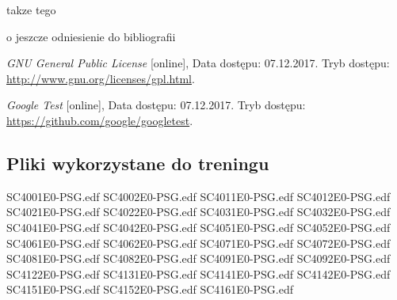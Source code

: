 \documentclass[12pt, notitlepage]{report}
\begin{document}
takze tego

o jeszcze odniesienie do bibliografii \cite{gtest}

\begin{thebibliography}{9}

\textit{GNU General Public License} [online], Data dostępu: 07.12.2017. 
\newline Tryb dostępu: \url{http://www.gnu.org/licenses/gpl.html}.


\textit{Google Test} [online], Data dostępu: 07.12.2017. \newline Tryb dostępu: \url{https://github.com/google/googletest}.

\end{thebibliography}

\begin{appendices}
    \chapter{Pliki wykorzystane do treningu}
    \label{appendix:A}
    SC4001E0-PSG.edf \newline
    SC4002E0-PSG.edf \newline
    SC4011E0-PSG.edf \newline
    SC4012E0-PSG.edf \newline
    SC4021E0-PSG.edf \newline
    SC4022E0-PSG.edf \newline
    SC4031E0-PSG.edf \newline
    SC4032E0-PSG.edf \newline
    SC4041E0-PSG.edf \newline
    SC4042E0-PSG.edf \newline
    SC4051E0-PSG.edf \newline
    SC4052E0-PSG.edf \newline
    SC4061E0-PSG.edf \newline
    SC4062E0-PSG.edf \newline
    SC4071E0-PSG.edf \newline
    SC4072E0-PSG.edf \newline
    SC4081E0-PSG.edf \newline
    SC4082E0-PSG.edf \newline
    SC4091E0-PSG.edf \newline
    SC4092E0-PSG.edf \newline
    SC4122E0-PSG.edf \newline
    SC4131E0-PSG.edf \newline
    SC4141E0-PSG.edf \newline
    SC4142E0-PSG.edf \newline
    SC4151E0-PSG.edf \newline
    SC4152E0-PSG.edf \newline
    SC4161E0-PSG.edf


\end{appendices}
\end{document}
